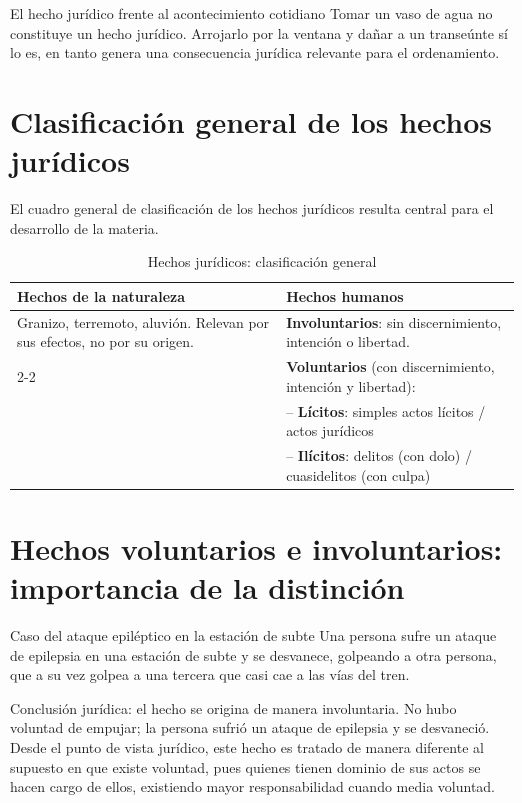 \documentclass[12pt,oneside]{book}
\begin{document}
\begin{example}{El hecho jurídico frente al acontecimiento cotidiano}
Tomar un vaso de agua no constituye un hecho jurídico. Arrojarlo por la ventana y dañar a un transeúnte sí lo es, en tanto genera una consecuencia jurídica relevante para el ordenamiento.
\end{example}

\section{Clasificación general de los hechos jurídicos}
\label{sec:clasifhechos}

El cuadro general de clasificación de los hechos jurídicos resulta central para el desarrollo de la materia.

\begin{table}[H]
\centering
\caption{Hechos jurídicos: clasificación general}
\begin{tabularx}{\textwidth}{X X}
\toprule
\textbf{Hechos de la naturaleza} & \textbf{Hechos humanos} \\
\midrule
Granizo, terremoto, aluvión. Relevan por sus efectos, no por su origen. &
\textbf{Involuntarios}: sin discernimiento, intención o libertad. \\
\cmidrule(l){2-2}
 & \textbf{Voluntarios} (con discernimiento, intención y libertad): \\
 & \quad -- \textbf{Lícitos}: simples actos lícitos / actos jurídicos \\
 & \quad -- \textbf{Ilícitos}: delitos (con dolo) / cuasidelitos (con culpa) \\
\bottomrule
\end{tabularx}
\end{table}

\section{Hechos voluntarios e involuntarios: importancia de la distinción}

\begin{example}{Caso del ataque epiléptico en la estación de subte}
Una persona sufre un ataque de epilepsia en una estación de subte y se desvanece, golpeando a otra persona, que a su vez golpea a una tercera que casi cae a las vías del tren.

Conclusión jurídica: el hecho se origina de manera involuntaria. No hubo voluntad de empujar; la persona sufrió un ataque de epilepsia y se desvaneció. Desde el punto de vista jurídico, este hecho es tratado de manera diferente al supuesto en que existe voluntad, pues quienes tienen dominio de sus actos se hacen cargo de ellos, existiendo mayor responsabilidad cuando media voluntad.
\end{example}
\end{document}
